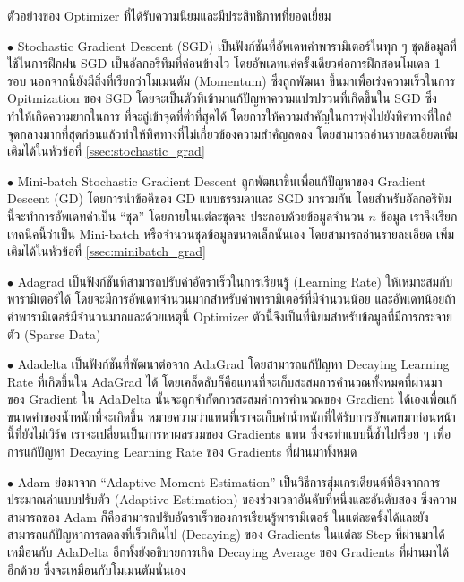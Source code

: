 \noindent ตัวอย่างของ Optimizer ที่ได้รับความนิยมและมีประสิทธิภาพที่ยอดเยี่ยม

\noindent $\bullet$ Stochastic Gradient Descent (SGD) เป็นฟังก์ชันที่อัพเดทค่าพารามิเตอร์ในทุก ๆ ชุดข้อมูลที่ใช้ในการฝึกฝน SGD
เป็นอัลกอริทึมที่ค่อนข้างไว โดยอัพเดทแค่ครั้งเดียวต่อการฝึกสอนโมเดล 1 รอบ นอกจากนี้ยังมีสิ่งที่เรียกว่าโมเมนตัม (Momentum) ซึ่งถูกพัฒนา%
ขึ้นมาเพื่อเร่งความเร็วในการ Opitmization ของ SGD โดยจะเป็นตัวที่เข้ามาแก้ปัญหาความแปรปรวนที่เกิดขึ้นใน SGD ซึ่งทำให้เกิดความยากในการ%
ที่จะลู่เข้าจุดที่ต่ำที่สุดได้ โดยการให้ความสำคัญในการพุ่งไปยังทิศทางที่ใกล้จุดกลางมากที่สุดก่อนแล้วทำให้ทิศทางที่ไม่เกี่ยวข้องความสำคัญลดลง
โดยสามารถอ่านรายละเอียดเพิ่มเติมได้ในหัวข้อที่ \ref{ssec:stochastic_grad}

\noindent $\bullet$ Mini-batch Stochastic Gradient Descent ถูกพัฒนาขึ้นเพื่อแก้ปัญหาของ Gradient Descent (GD)
โดยการนำข้อดีของ GD แบบธรรมดาและ SGD มารวมกัน โดยสำหรับอัลกอริทึมนี้จะทำการอัพเดทค่าเป็น \enquote{ชุด} โดยภายในแต่ละชุดจะ%
ประกอบด้วยข้อมูลจำนวน $n$ ข้อมูล เราจึงเรียกเทคนิคนี้ว่าเป็น Mini-batch หรือจำนวนชุดข้อมูลขนาดเล็กนั่นเอง โดยสามารถอ่านรายละเอียด%
เพิ่มเติมได้ในหัวข้อที่ \ref{ssec:minibatch_grad}

\noindent $\bullet$ Adagrad เป็นฟังก์ชันที่สามารถปรับค่าอัตราเร็วในการเรียนรู้ (Learning Rate) ให้เหมาะสมกับพารามิเตอร์ได้
โดยจะมีการอัพเดทจำนวนมากสำหรับค่าพารามิเตอร์ที่มีจำนวนน้อย และอัพเดทน้อยถ้าค่าพารามิเตอร์มีจำนวนมากและด้วยเหตุนี้ Optimizer
ตัวนี้จึงเป็นที่นิยมสำหรับข้อมูลที่มีการกระจายตัว (Sparse Data)

\noindent $\bullet$ Adadelta เป็นฟังก์ชันที่พัฒนาต่อจาก AdaGrad โดยสามารถแก้ปัญหา Decaying Learning Rate ที่เกิดขึ้นใน
AdaGrad ได้ โดยเคล็ดลับก็คือแทนที่จะเก็บสะสมการคำนวณทั้งหมดที่ผ่านมาของ Gradient ใน AdaDelta นั้นจะถูกจำกัดการสะสมค่าการคำนวณของ
Gradient ได้เองเพื่อแก้ขนาดค่าของน้ำหนักที่จะเกิดขึ้น หมายความว่าแทนที่เราจะเก็บค่าน้ำหนักที่ได้รับการอัพเดทมาก่อนหน้านี้ที่ยังไม่เวิร์ค
เราจะเปลี่ยนเป็นการหาผลรวมของ Gradients แทน ซึ่งจะทำแบบนี้ซ้ำไปเรื่อย ๆ เพื่อการแก้ปัญหา Decaying Learning Rate ของ Gradients
ที่ผ่านมาทั้งหมด

\noindent $\bullet$ Adam ย่อมาจาก \enquote{Adaptive Moment Estimation} เป็นวิธีการสุ่มเกรเดียนต์ที่อิงจากการประมาณค่าแบบปรับตัว
(Adaptive Estimation) ของช่วงเวลาอันดับที่หนึ่งและอันดับสอง ซึ่งความสามารถของ Adam ก็คือสามารถปรับอัตราเร็วของการเรียนรู้พารามิเตอร์%
ในแต่ละครั้งได้และยังสามารถแก้ปัญหาการลดลงที่เร็วเกินไป (Decaying) ของ Gradients ในแต่ละ Step ที่ผ่านมาได้เหมือนกับ AdaDelta
อีกทั้งยังอธิบายการเกิด Decaying Average ของ Gradients ที่ผ่านมาได้อีกด้วย ซึ่งจะเหมือนกับโมเมนตัมนั่นเอง

